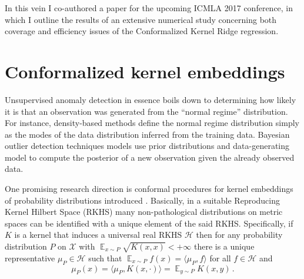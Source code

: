 \documentclass{extarticle}
\newcommand{\ex}{\mathop{\mathbb{E}}\nolimits}
\newcommand{\Hcal}{\mathcal{H}}
\newcommand{\Xcal}{\mathcal{X}}
\begin{document}
In this vein I co-authored a paper for the upcoming ICMLA 2017 conference, in which
I outline the results of an extensive numerical study concerning both coverage and
efficiency issues of the Conformalized Kernel Ridge regression.


\section{Conformalized kernel embeddings} %
\label{sec:conformalized_kernel_embeddings}


Unsupervised anomaly detection in essence boils down to determining how likely it
is that an observation was generated from the ``normal regime'' distribution. For
instance, density-based methods define the normal regime distribution simply as
the modes of the data distribution inferred from the training data. Bayesian outlier
detection techniques models use prior distributions and data-generating model to
compute the posterior of a new observation given the already observed data.

One promising research direction is conformal procedures for kernel embeddings of
probability distributions introduced \cite{smola2007}. Basically, in a suitable
Reproducing Kernel Hilbert Space (RKHS) many non-pathological distributions on metric
spaces can be identified with a unique element of the said RKHS. Specifically, if
$K$ is a kernel that induces a universal real RKHS $\Hcal$ then for any probability
distribution $P$ on $\Xcal$ with $\ex_{x\sim P} \sqrt{K(x,x)} < +\infty$ there is
a unique representative $\mu_P\in \Hcal$ such that $\ex_{x\sim P} f(x) = \langle \mu_P, f\rangle$
for all $f\in \Hcal$ and
\begin{equation*}
  \mu_P(x) = \langle \mu_P, K(x, \cdot) \rangle = \ex_{y\sim P} K(x, y) \,.
\end{equation*}
\end{document}
